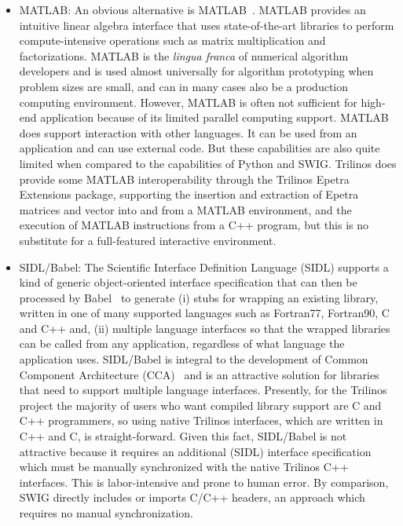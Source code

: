 \documentclass[acmtocl]{acmtrans2m}
\begin{document}
\begin{itemize}

\item MATLAB: An obvious alternative is
  MATLAB~\cite{Matlab-home-page}.  MATLAB provides an intuitive linear
  algebra interface that uses state-of-the-art libraries to perform
  compute-intensive operations such as matrix multiplication and
  factorizations.  MATLAB is the {\it lingua franca} of numerical
  algorithm developers and is used almost universally for algorithm
  prototyping when problem sizes are small, and can in many cases also
  be a production computing environment. However, MATLAB is often not
  sufficient for high-end application because of its limited parallel
  computing support.  MATLAB does support interaction with other
  languages.  It can be used from an application and can use external
  code.  But these capabilities are also quite limited when compared
  to the capabilities of Python and SWIG.  Trilinos does provide some
  MATLAB interoperability through the Trilinos Epetra Extensions
  package, supporting the insertion and extraction of Epetra matrices
  and vector into and from a MATLAB environment, and the execution of
  MATLAB instructions from a C++ program, but this is no substitute
  for a full-featured interactive environment.

\item SIDL/Babel: The Scientific Interface Definition Language (SIDL)
  supports a kind of generic object-oriented interface specification
  that can then be processed by Babel~\cite{Babel-home-page} to
  generate (i) stubs for wrapping an existing library, written in one
  of many supported languages such as Fortran77, Fortran90, C and C++
  and, (ii) multiple language interfaces so that the wrapped libraries
  can be called from any application, regardless of what language the
  application uses.  SIDL/Babel is integral to the development of
  Common Component Architecture (CCA)~\cite{cca} and is an attractive
  solution for libraries that need to support multiple language
  interfaces.  Presently, for the Trilinos project the majority of
  users who want compiled library support are C and C++ programmers,
  so using native Trilinos interfaces, which are written in C++ and C,
  is straight-forward.  Given this fact, SIDL/Babel is not attractive
  because it requires an additional (SIDL) interface specification
  which must be manually synchronized with the native Trilinos C++
  interfaces.  This is labor-intensive and prone to human error.  By
  comparison, SWIG directly includes or imports C/C++ headers, an
  approach which requires no manual synchronization.

\end{itemize}
\end{document}
